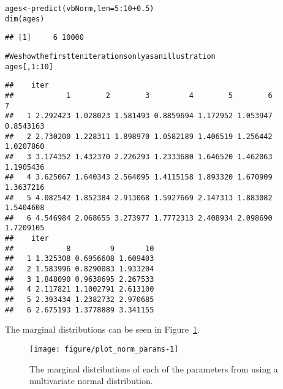 \documentclass[a4paper,english,10pt]{article}\usepackage[]{graphicx}\usepackage[]{color}
\makeatletter
\newcommand{\hlnum}[1]{\textcolor[rgb]{0.063,0.58,0.627}{#1}}%
\newcommand{\hlcom}[1]{\textcolor[rgb]{0.588,0.588,0.588}{#1}}%
\newcommand{\hlopt}[1]{\textcolor[rgb]{0.196,0.196,0.196}{#1}}%
\newcommand{\hlstd}[1]{\textcolor[rgb]{0.196,0.196,0.196}{#1}}%
\newcommand{\hlkwb}[1]{\textcolor[rgb]{0.627,0,0.314}{#1}}%
\newcommand{\hlkwc}[1]{\textcolor[rgb]{0,0.631,0.314}{#1}}%
\newcommand{\hlkwd}[1]{\textcolor[rgb]{0.78,0.227,0.412}{#1}}%
\newenvironment{kframe}{%
 \def\at@end@of@kframe{}%
 \ifinner\ifhmode%
  \def\at@end@of@kframe{\end{minipage}}%
  \begin{minipage}{\columnwidth}%
 \fi\fi%
 \def\FrameCommand##1{\hskip\@totalleftmargin \hskip-\fboxsep
 \colorbox{shadecolor}{##1}\hskip-\fboxsep
     \hskip-\linewidth \hskip-\@totalleftmargin \hskip\columnwidth}%
 \MakeFramed {\advance\hsize-\width
   \@totalleftmargin\z@ \linewidth\hsize
   \@setminipage}}%
 {\par\unskip\endMakeFramed%
 \at@end@of@kframe}
\newenvironment{knitrout}{}{} %
\makeatother
\begin{document}
\begin{knitrout}
\color{fgcolor}\begin{kframe}
\begin{alltt}
\hlstd{ages} \hlkwb{<-} \hlkwd{predict}\hlstd{(vbNorm,} \hlkwc{len} \hlstd{=} \hlnum{5}\hlopt{:}\hlnum{10} \hlopt{+} \hlnum{0.5}\hlstd{)}
\hlkwd{dim}\hlstd{(ages)}
\end{alltt}
\begin{verbatim}
## [1]     6 10000
\end{verbatim}
\begin{alltt}
\hlcom{# We show the first ten iterations only as an illustration}
\hlstd{ages[,} \hlnum{1}\hlopt{:}\hlnum{10}\hlstd{]}
\end{alltt}
\begin{verbatim}
##    iter
##            1        2        3         4        5        6         7
##   1 2.292423 1.028023 1.581493 0.8859694 1.172952 1.053947 0.8543163
##   2 2.730200 1.228311 1.898970 1.0582189 1.406519 1.256442 1.0207860
##   3 3.174352 1.432370 2.226293 1.2333680 1.646520 1.462063 1.1905436
##   4 3.625067 1.640343 2.564095 1.4115158 1.893320 1.670909 1.3637216
##   5 4.082542 1.852384 2.913068 1.5927669 2.147313 1.883082 1.5404608
##   6 4.546984 2.068655 3.273977 1.7772313 2.408934 2.098690 1.7209105
##    iter
##            8         9       10
##   1 1.325308 0.6956608 1.609403
##   2 1.583996 0.8290083 1.933204
##   3 1.848090 0.9638695 2.267533
##   4 2.117821 1.1002791 2.613100
##   5 2.393434 1.2382732 2.970685
##   6 2.675193 1.3778889 3.341155
\end{verbatim}
\end{kframe}
\end{knitrout}

The marginal distributions can be seen in Figure~\ref{fig:plot_norm_params}.

\begin{knitrout}
\color{fgcolor}\begin{figure}[H]

{\centering \texttt{[image: figure/plot\_norm\_params-1]} 

}

\caption[The marginal distributions of each of the parameters from using a multivariate normal distribution]{The marginal distributions of each of the parameters from using a multivariate normal distribution.}\label{fig:plot_norm_params}
\end{figure}


\end{knitrout}
\end{document}
